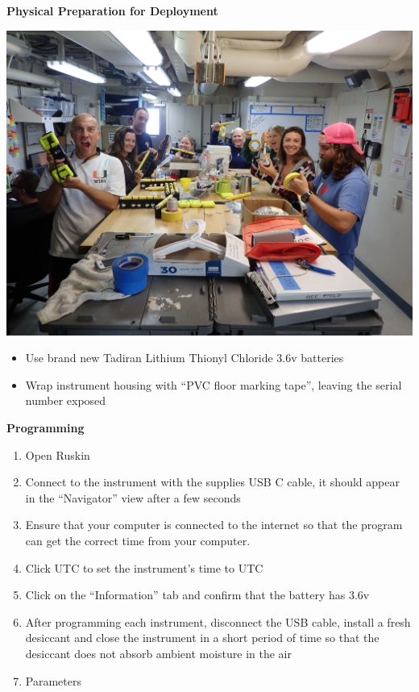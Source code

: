 \documentclass[]{book}
\begin{document}
\textbf{Physical Preparation for Deployment}

\includegraphics{images/STR_party_2019.jpg}

\begin{itemize}
\item
  Use brand new Tadiran Lithium Thionyl Chloride 3.6v batteries
\item
  Wrap instrument housing with ``PVC floor marking tape'', leaving the serial number exposed
\end{itemize}

\textbf{Programming}

\begin{enumerate}
\def\labelenumi{\arabic{enumi}.}
\item
  Open Ruskin
\item
  Connect to the instrument with the supplies USB C cable, it should appear in the ``Navigator'' view after a few seconds
\item
  Ensure that your computer is connected to the internet so that the program can get the correct time from your computer.
\item
  Click UTC to set the instrument's time to UTC
\item
  Click on the ``Information'' tab and confirm that the battery has 3.6v
\item
  After programming each instrument, disconnect the USB cable, install a fresh desiccant and close the instrument in a short period of time so that the desiccant does not absorb ambient moisture in the air
\item
  Parameters
\end{enumerate}
\end{document}
